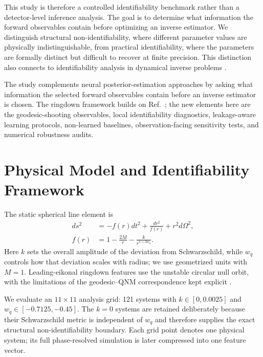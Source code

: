 \documentclass[11pt]{article}
\newcommand{\wq}{w_q}
\begin{document}
This study is therefore a controlled identifiability benchmark rather than a
detector-level inference analysis. The goal is to determine what information
the forward observables contain before optimizing an inverse estimator. We
distinguish structural non-identifiability, where different parameter values
are physically indistinguishable, from practical identifiability, where the
parameters are formally distinct but difficult to recover at finite precision.
This distinction also connects to identifiability analysis in dynamical inverse
problems \cite{raue2009identifiability,villaverde2019identifiability}.

The study complements neural posterior-estimation approaches
\cite{dax2021realtime,green2020autoregressive,gabbard2022cvae,cranmer2020frontier,papamakarios2021normalizing,pacilio2024ringdown}
by asking what information the selected forward observables contain before an
inverse estimator is chosen. The ringdown framework builds on
Ref.~\cite{palominoylla2026ringdown}; the new elements here are the
geodesic-shooting observables, local identifiability diagnostics, leakage-aware
learning protocols, non-learned baselines, observation-facing sensitivity
tests, and numerical robustness audits.

\section{Physical Model and Identifiability Framework}
The static spherical line element is
\begin{align}
 ds^2&=-f(r)dt^2+\frac{dr^2}{f(r)}+r^2d\Omega^2,\\
 f(r)&=1-\frac{2M}{r}-\frac{k}{r^{1+3\wq}}.
\end{align}
Here $k$ sets the overall amplitude of the deviation from Schwarzschild, while
$\wq$ controls how that deviation scales with radius; we use geometrized units
with $M=1$. Leading-eikonal ringdown features use the
unstable circular null orbit, with the limitations of the geodesic--QNM
correspondence kept explicit
\cite{cardoso2009geodesic,konoplya2017correspondence,palominoylla2026ringdown}.

We evaluate an $11\times11$ analysis grid: 121
systems with $k\in[0,0.0025]$ and
$\wq\in[-0.7125,-0.45]$. The $k=0$ systems are retained deliberately because
their Schwarzschild metric is independent of $\wq$ and therefore supplies the
exact structural non-identifiability boundary. Each grid point denotes one
physical system; its full phase-resolved simulation is later compressed into
one feature vector.
\end{document}
